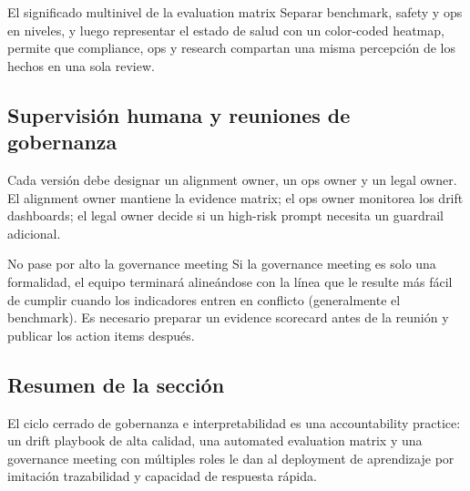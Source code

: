 \begin{importantbox}{El significado multinivel de la evaluation matrix}
Separar benchmark, safety y ops en niveles, y luego representar el estado de salud con un color-coded heatmap, permite que compliance, ops y research compartan una misma percepción de los hechos en una sola review.
\end{importantbox}

\subsection{Supervisión humana y reuniones de gobernanza}

Cada versión debe designar un alignment owner, un ops owner y un legal owner. El alignment owner mantiene la evidence matrix; el ops owner monitorea los drift dashboards; el legal owner decide si un high-risk prompt necesita un guardrail adicional.

\begin{warningbox}{No pase por alto la governance meeting}
Si la governance meeting es solo una formalidad, el equipo terminará alineándose con la línea que le resulte más fácil de cumplir cuando los indicadores entren en conflicto (generalmente el benchmark). Es necesario preparar un evidence scorecard antes de la reunión y publicar los action items después.
\end{warningbox}

\subsection{Resumen de la sección}

El ciclo cerrado de gobernanza e interpretabilidad es una accountability practice: un drift playbook de alta calidad, una automated evaluation matrix y una governance meeting con múltiples roles le dan al deployment de aprendizaje por imitación trazabilidad y capacidad de respuesta rápida.
